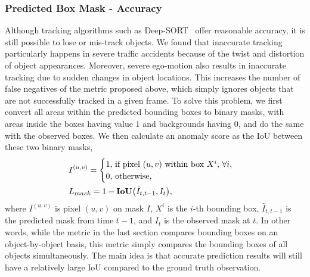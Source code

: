 \documentclass[letterpaper, 10 pt, conference]{ieeeconf}
\theoremstyle{definition}
\theoremstyle{remark}
\begin{document}
\subsubsection{Predicted Box Mask - Accuracy}
\label{sec:metrics_two}
Although tracking algorithms such as Deep-SORT~\cite{wojke2017simple}
offer reasonable accuracy, it is still possible
to lose or mis-track objects. We found that inaccurate tracking
particularly happens in severe traffic accidents because of the twist and distortion of
object appearances. Moreover, severe ego-motion also results in
inaccurate tracking due to sudden changes in object 
locations. This increases the number of false negatives of the metric
proposed above, which simply ignores objects that are not
successfully tracked in a given frame.
To solve this problem, 
we first convert all areas within the predicted bounding boxes to
binary masks, with areas inside the boxes having value $1$ and backgrounds having $0$,
and do the same with the observed boxes.
We then calculate an anomaly score as the IoU between these two binary masks,
\begin{align}
    & I^{(u,v)}  = \begin{cases}
                    1 \text{, if pixel $(u,v)$ within box $X^{i},\, \forall i,$}\\
                    0 \text{, otherwise,}
                \end{cases} \label{eq:mask} \\
    & L_{mask} = 1 - \text{\textbf{IoU}}\big(\hat{I}_{t,t-1}, I_t\big), \label{eq:l_mask}
\end{align}
where $I^{(u,v)}$ is pixel $(u,v)$ on mask $I$, $X^{i}$ is the
$i$-th bounding box, $\hat{I}_{t,t-1}$ is the predicted mask
from time $t-1$, and $I_t$ is the observed mask at $t$.
In other words, while the metric in the last section compares bounding
boxes on an object-by-object basis, this metric simply compares the bounding
boxes of all objects simultaneously.
The main idea is that
accurate prediction results will still have a relatively large IoU compared
to the ground truth observation.
\end{document}

